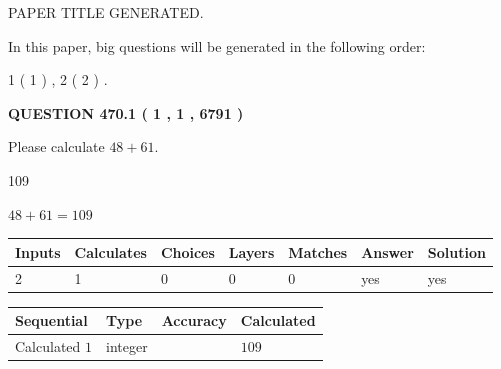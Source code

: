 \documentclass[12pt]{article}
\begin{document}
 
 
 
   
   
 PAPER TITLE GENERATED.
   
   
   
\vspace{0.2in}
   
In this paper, big questions will be generated in the following order: 
   
   
   1 ( 1 )
 ,
   2 ( 2 )
 .
  
\vspace{0.2in}
  
{\textbf{\Large{QUESTION
470.1 
 ( 1 , 1 , 6791 )
}}}
  
  
 
Please calculate $ %
48 +  %
61 $.
 
 
 
\noindent{}
 
 

109
 
 
\noindent{}
 
 

 
 
 
\noindent{}
 
 

$ %
48 +  %
61=   %
109$
 
 
\noindent{}
 
 

 
   
   
   
   
\noindent\begin{tabular}{|l|l|l|l|l|l|l|}
 \hline
Inputs & Calculates & Choices & Layers & Matches & Answer & Solution \\ \hline
 2  & 
 1  & 
 0
  & 
 0  & 
 0  & 
  yes & 
  yes 
  \\ \hline
 \end{tabular}
   
   
   
   
\noindent{}
   
   
  
  
\noindent\begin{tabular}{|l|l|l|l|}
\hline
 Sequential & Type & Accuracy & Calculated \\ 
\hline
 
 
  Calculated $  1 $ & integer &  & 
  $ 109 $ 
 \\  \hline  
 \end{tabular}
   
\end{document}
